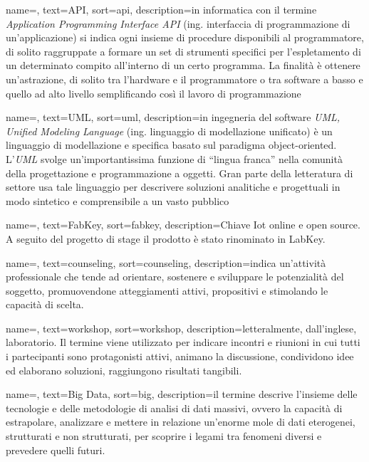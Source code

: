 \renewcommand{\glossaryname}{Glossario}

{
    name=,
    text=API,
    sort=api,
    description={in informatica con il termine \emph{Application Programming Interface API} (ing. interfaccia di programmazione di un'applicazione) si indica ogni insieme di procedure disponibili al programmatore, di solito raggruppate a formare un set di strumenti specifici per l'espletamento di un determinato compito all'interno di un certo programma. La finalità è ottenere un'astrazione, di solito tra l'hardware e il programmatore o tra software a basso e quello ad alto livello semplificando così il lavoro di programmazione}
}

{
    name=,
    text=UML,
    sort=uml,
    description={in ingegneria del software \emph{UML, Unified Modeling Language} (ing. linguaggio di modellazione unificato) è un linguaggio di modellazione e specifica basato sul paradigma object-oriented. L'\emph{UML} svolge un'importantissima funzione di ``lingua franca'' nella comunità della progettazione e programmazione a oggetti. Gran parte della letteratura di settore usa tale linguaggio per descrivere soluzioni analitiche e progettuali in modo sintetico e comprensibile a un vasto pubblico}
}

{
    name=,
    text=FabKey,
    sort=fabkey,
    description={Chiave Iot online e open source. A seguito del progetto di stage il prodotto è stato rinominato in LabKey.}
}

{
	name=,
    text=counseling,
    sort=counseling,
    description={indica un'attività professionale che tende ad orientare, sostenere e sviluppare le potenzialità del soggetto, promuovendone atteggiamenti attivi, propositivi e stimolando le capacità di scelta.}
}

{
	name=,
    text=workshop,
    sort=workshop,
    description={letteralmente, dall'inglese, laboratorio. Il termine viene utilizzato per indicare incontri e riunioni in cui tutti i partecipanti sono protagonisti attivi, animano la discussione, condividono idee ed elaborano soluzioni, raggiungono risultati tangibili.}
}

{
	name=,
    text=Big Data,
    sort=big,
    description={il termine descrive l'insieme delle tecnologie e delle metodologie di analisi di dati massivi, ovvero la capacità di estrapolare, analizzare e mettere in relazione un'enorme mole di dati eterogenei, strutturati e non strutturati, per scoprire i legami tra fenomeni diversi e prevedere quelli futuri.}
}

